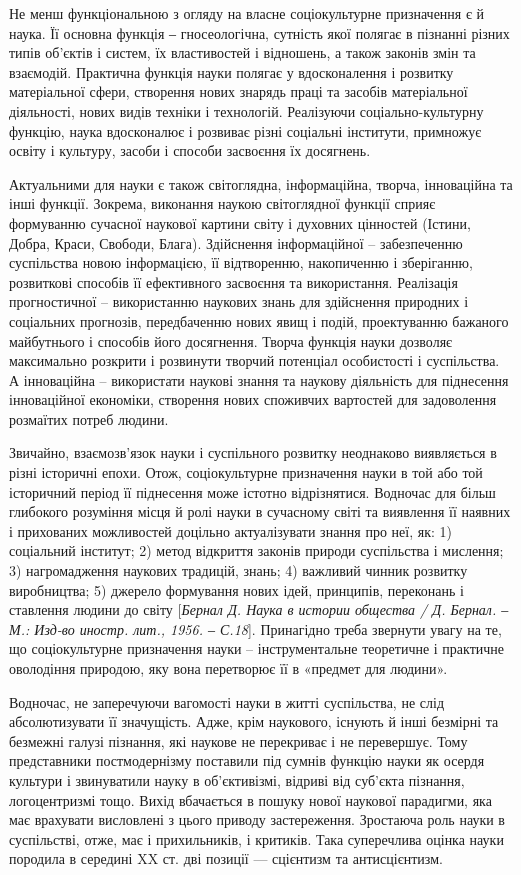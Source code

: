 Не менш функціональною з огляду на власне соціокультурне призначення є
й наука. Її основна функція ‒ гносеологічна, сутність якої полягає в пізнанні
різних типів об’єктів і систем, їх властивостей і відношень, а також законів змін
та взаємодій. Практична функція науки полягає у вдосконалення і розвитку
матеріальної сфери, створення нових знарядь праці та засобів матеріальної
діяльності, нових видів техніки і технологій. Реалізуючи соціально-культурну
функцію, наука вдосконалює і розвиває різні соціальні інститути, примножує
освіту і культуру, засоби і способи засвоєння їх досягнень.

Актуальними для науки є також світоглядна, інформаційна, творча,
інноваційна та інші функції. Зокрема, виконання наукою світоглядної функції
сприяє формуванню сучасної наукової картини світу і духовних цінностей
(Істини, Добра, Краси, Свободи, Блага). Здійснення інформаційної –
забезпеченню суспільства новою інформацією, її відтворенню, накопиченню і
зберіганню, розвиткові способів її ефективного засвоєння та використання.
Реалізація прогностичної – використанню наукових знань для здійснення
природних і соціальних прогнозів, передбаченню нових явищ і подій,
проектуванню бажаного майбутнього і способів його досягнення. Творча
функція науки дозволяє максимально розкрити і розвинути творчий потенціал
особистості і суспільства. А інноваційна – використати наукові знання та
наукову діяльність для піднесення інноваційної економіки, створення нових
споживчих вартостей для задоволення розмаїтих потреб людини.

Звичайно, взаємозв’язок науки і суспільного розвитку неоднаково
виявляється в різні історичні епохи. Отож, соціокультурне призначення науки в
той або той історичний період її піднесення може істотно відрізнятися.
Водночас для більш глибокого розуміння місця й ролі науки в сучасному світі
та виявлення її наявних і прихованих можливостей доцільно актуалізувати
знання про неї, як: 1) соціальний інститут; 2) метод відкриття законів природи
суспільства і мислення; 3) нагромадження наукових традицій, знань;
4) важливий чинник розвитку виробництва; 5) джерело формування нових ідей,
принципів, переконань і ставлення людини до світу [\textit{Бернал Д. Наука в истории 
общества / Д. Бернал. ‒ М.: Изд-во иностр. лит., 1956. ‒ С.18}]. Принагідно
треба звернути увагу на те, що соціокультурне призначення науки –
інструментальне теоретичне і практичне оволодіння природою, яку вона
перетворює її в «предмет для людини».

Водночас, не заперечуючи вагомості науки в житті суспільства, не слід
абсолютизувати її значущість. Адже, крім наукового, існують й інші безмірні та
безмежні галузі пізнання, які наукове не перекриває і не перевершує. Тому
представники постмодернізму поставили під сумнів функцію науки як осердя
культури і звинуватили науку в об’єктивізмі, відриві від суб’єкта пізнання,
логоцентризмі тощо. Вихід вбачається в пошуку нової наукової парадигми, яка
має врахувати висловлені з цього приводу застереження. Зростаюча роль науки
в суспільстві, отже, має і прихильників, і критиків. Така суперечлива оцінка
науки породила в середині XX ст. дві позиції --- сцієнтизм та антисцієнтизм.

